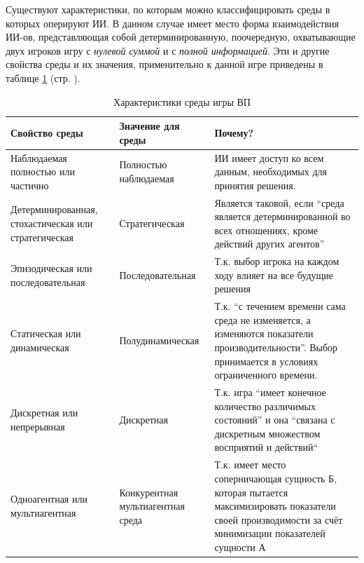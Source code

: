 \documentclass[12pt]{report}
\begin{document}
Существуют характеристики, по которым можно классифицировать среды в которых оперируют ИИ. \citep{russell1995} В данном случае имеет место форма взаимодействия ИИ-ов, представляющая собой детерминированную, поочередную, охватывающие двух игроков игру с \emph{нулевой суммой} и с \emph{полной информацией}. \citep{russell1995, morgenstern1947} Эти и другие свойства среды и их значения, применительно к данной игре приведены в таблице \ref{tab:evn_properties} (стр. \pageref{tab:evn_properties}).

\begin{table}[h!]
	\centering
	\begin{tabular}{ | p{3.6cm} | p{3cm} | p{7.2cm} |}	
	\hline
	Свойство среды & \raggedright Значение для среды & Почему? \\ \hline \hline
	\raggedright Наблюдаемая полностью или частично & \raggedright Полностью наблюдаемая & ИИ имеет доступ ко всем данным, необходимых для принятия решения. \\ \hline
	\raggedright Детерминированная, стохастическая или стратегическая & \raggedright Стратегическая &  Является таковой, если ``среда является детерминированной во всех отношениях, кроме действий других агентов''\citep{russell1995} \\ \hline
	\raggedright Эпизодическая или последовательная & \raggedright После\-до\-ва\-тель\-ная & Т.к. выбор игрока на каждом ходу влияет на все будущие решения \\ \hline
	\raggedright Статическая или динамическая & \raggedright Полуди\-на\-ми\-чес\-кая & Т.к. ``с течением времени сама среда не изменяется, а изменяются показатели производительности''. \citep{russell1995} Выбор принимается в условиях ограниченного времени. \\ \hline
	\raggedright Дискретная или непрерывная & \raggedright Дискретная & Т.к. игра ``имеет конечное количество различимых состояний'' и она ``связана с дискретным множеством восприятий и действий`` \citep{russell1995} \\ \hline
	\raggedright Одноагентная или мультиагентная & \raggedright Конкурентная мультиагентная среда & Т.к. имеет место соперничающая сущность Б, которая пытается максимизировать показатели своей производимости за счёт минимизации показателей сущности А \\ \hline
	\end{tabular}
	\caption{Характеристики среды игры ВП}
	\label{tab:evn_properties}
\end{table}
\end{document}
